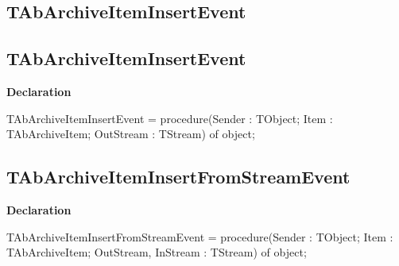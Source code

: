 \documentclass{report}
\newif\ifpdf
\begin{document}
\subsection*{\large{\textbf{TAbArchiveItemInsertEvent}}\normalsize\hspace{1ex}\hrulefill}
\else
\subsection*{TAbArchiveItemInsertEvent}
\fi
\label{AbArcTyp-TAbArchiveItemInsertEvent}
\begin{list}{}{
\setlength{\itemindent}{0cm}
\setlength{\listparindent}{0cm}
\setlength{\leftmargin}{\evensidemargin}
\addtolength{\leftmargin}{\tmplength}
\settowidth{\labelsep}{X}
\addtolength{\leftmargin}{\labelsep}
\setlength{\labelwidth}{\tmplength}
}
\item[\textbf{Declaration}\hfill]
\ifpdf
\begin{flushleft}
\fi
\begin{ttfamily}
TAbArchiveItemInsertEvent = procedure(Sender : TObject; Item : TAbArchiveItem; OutStream : TStream) of object;\end{ttfamily}

\ifpdf
\end{flushleft}
\fi

\end{list}
\ifpdf
\subsection*{\large{\textbf{TAbArchiveItemInsertFromStreamEvent}}\normalsize\hspace{1ex}\hrulefill}
\else
\subsection*{TAbArchiveItemInsertFromStreamEvent}
\fi
\label{AbArcTyp-TAbArchiveItemInsertFromStreamEvent}
\begin{list}{}{
\setlength{\itemindent}{0cm}
\setlength{\listparindent}{0cm}
\setlength{\leftmargin}{\evensidemargin}
\addtolength{\leftmargin}{\tmplength}
\settowidth{\labelsep}{X}
\addtolength{\leftmargin}{\labelsep}
\setlength{\labelwidth}{\tmplength}
}
\item[\textbf{Declaration}\hfill]
\ifpdf
\begin{flushleft}
\fi
\begin{ttfamily}
TAbArchiveItemInsertFromStreamEvent = procedure(Sender : TObject; Item : TAbArchiveItem; OutStream, InStream : TStream) of object;\end{ttfamily}

\ifpdf
\end{flushleft}
\fi

\end{list}
\ifpdf
\end{document}
